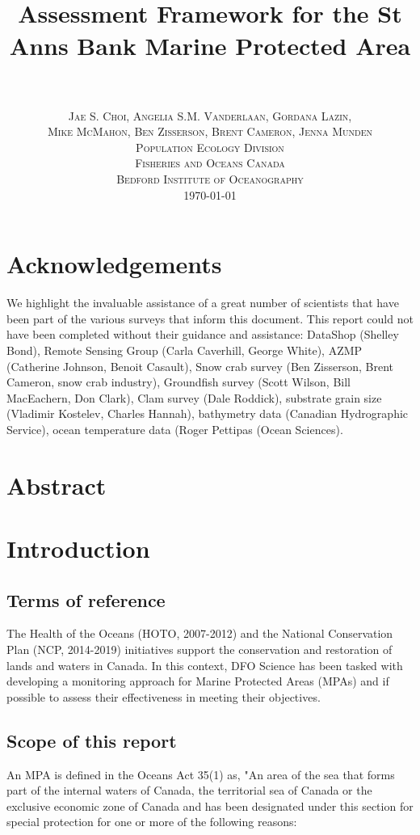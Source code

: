 \documentclass[letterpaper,portrait,11pt]{scrartcl}
\title{
		\usefont{OT1}{bch}{b}{n}
		\horrule{0.5pt} \\[0.4cm]
		\huge Assessment Framework for the St Anns Bank Marine Protected Area  \\
		\horrule{2pt} \\[1.0cm]
}
\author{
		\normalfont \normalsize  \textsc{Jae S. Choi, Angelia S.M. Vanderlaan, Gordana Lazin,} \\
    \normalfont \normalsize  \textsc{Mike McMahon,  Ben Zisserson, Brent Cameron, Jenna Munden} \\ [25pt]		
		\normalfont \normalsize \textsc{Population Ecology Division} \\ 
    \normalfont \normalsize \textsc{Fisheries and Oceans Canada} \\ 
    \normalfont \normalsize \textsc{Bedford Institute of Oceanography} \\ [25pt]
    \normalsize \textsc{\today}
}
\date{}
\numberwithin{equation}{section}		%
\numberwithin{figure}{section}			%
\numberwithin{table}{section}				%
\begin{document}
\maketitle

\setlength{\parskip}{12 pt} %
\setlength{\parindent}{0cm}
\setlength{\floatsep}{2cm}
\setcounter{tocdepth}{2} %
\setcounter{secnumdepth}{3} %
\tableofcontents 

\section*{Acknowledgements}

We highlight the invaluable assistance of a great number of scientists that have been part of the various surveys that inform this document. This report could not have been completed without their guidance and assistance: DataShop (Shelley Bond), Remote Sensing Group (Carla Caverhill, George White), AZMP (Catherine Johnson, Benoit Casault), Snow crab survey (Ben Zisserson, Brent Cameron, snow crab industry), Groundfish survey (Scott Wilson, Bill MacEachern, Don Clark), Clam survey (Dale Roddick), substrate grain size (Vladimir Kostelev, Charles Hannah), bathymetry data (Canadian Hydrographic Service), ocean temperature data (Roger Pettipas (Ocean Sciences).

\section*{Abstract}
\clearpage

\section{Introduction}

\subsection{Terms of reference}
The Health of the Oceans (HOTO, 2007-2012) and the National Conservation Plan (NCP, 2014-2019) initiatives support the conservation and restoration of lands and waters in Canada. In this context, DFO Science has been tasked with developing a monitoring approach for Marine Protected Areas (MPAs) and if possible to assess their effectiveness in meeting their objectives. 

\subsection{Scope of this report}
An MPA is defined in the Oceans Act 35(1) as, "An area of the sea that forms part of the internal waters of Canada, the territorial sea of Canada or the exclusive economic zone of Canada and has been designated under this section for special protection for one or more of the following reasons: 
\end{document}
